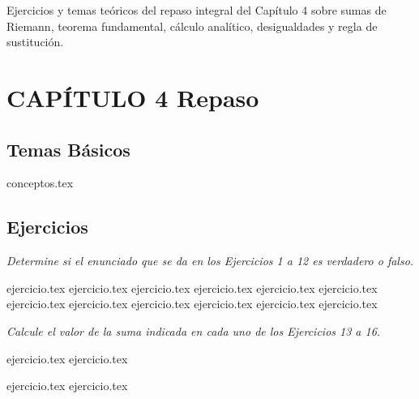
Ejercicios y temas teóricos del repaso integral del Capítulo 4 sobre sumas de Riemann, teorema fundamental, cálculo analítico, desigualdades y regla de sustitución.

\section*{CAPÍTULO 4 \quad Repaso}

\subsection*{Temas Básicos}
{conceptos.tex}

\subsection*{Ejercicios}

\noindent \textit{Determine si el enunciado que se da en los Ejercicios 1 a 12 es verdadero o falso.}

\begin{enumerate}
    {ejercicio.tex}
    {ejercicio.tex}
    {ejercicio.tex}
    {ejercicio.tex}
    {ejercicio.tex}
    {ejercicio.tex}
    {ejercicio.tex}
    {ejercicio.tex}
    {ejercicio.tex}
    {ejercicio.tex}
    {ejercicio.tex}
    {ejercicio.tex}
\end{enumerate}

\vspace{1em}
\noindent \textit{Calcule el valor de la suma indicada en cada uno de los Ejercicios 13 a 16.}

\begin{enumerate}
    \setcounter{enumi}{12}
    \begin{minipage}{0.45\textwidth}
    {ejercicio.tex}
    {ejercicio.tex}
    \end{minipage}%
    \begin{minipage}{0.45\textwidth}
    {ejercicio.tex}
    {ejercicio.tex}
    \end{minipage}
\end{enumerate}

